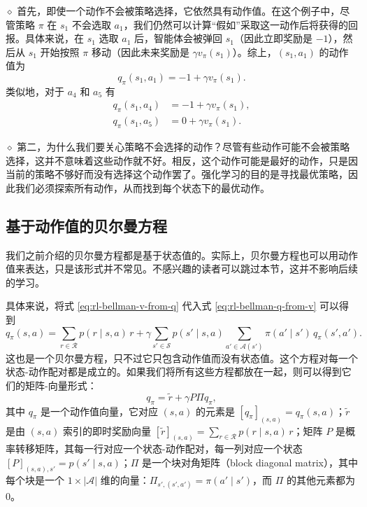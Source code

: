 \medskip
$\diamond$ 首先，即使一个动作不会被策略选择，它依然具有动作值。在这个例子中，尽管策略 $\pi$ 在 $s_1$ 不会选取 $a_1$，我们仍然可以计算“假如”采取这一动作后将获得的回报。具体来说，在 $s_1$ 选取 $a_1$ 后，智能体会被弹回 $s_1$（因此立即奖励是 $-1$），然后从 $s_1$ 开始按照 $\pi$ 移动（因此未来奖励是 $\gamma v_\pi(s_1)$）。综上，$(s_1, a_1)$ 的动作值为
\begin{equation*}
q_\pi(s_1, a_1) = -1 + \gamma v_\pi(s_1).
\end{equation*}
类似地，对于 $a_4$ 和 $a_5$ 有
\begin{equation*}
\begin{aligned}
q_\pi(s_1, a_4) &= -1 + \gamma v_\pi(s_1), \\
q_\pi(s_1, a_5) &= 0 + \gamma v_\pi(s_1).
\end{aligned}
\end{equation*}

\medskip
$\diamond$ 第二，为什么我们要关心策略不会选择的动作？尽管有些动作可能不会被策略选择，这并不意味着这些动作就不好。相反，这个动作可能是最好的动作，只是因当前的策略不够好而没有选择这个动作罢了。强化学习的目的是寻找最优策略，因此我们必须探索所有动作，从而找到每个状态下的最优动作。

\subsection{基于动作值的贝尔曼方程}
\label{sec:rl-bellman-action-value-bellman}

我们之前介绍的贝尔曼方程都是基于状态值的。实际上，贝尔曼方程也可以用动作值来表达，只是该形式并不常见。不感兴趣的读者可以跳过本节，这并不影响后续的学习。

具体来说，将式 \cref{eq:rl-bellman-v-from-q} 代入式 \cref{eq:rl-bellman-q-from-v} 可以得到
\begin{equation*}
q_\pi(s, a) = \sum_{r \in \mathcal{R}} p(r \mid s, a) \, r + \gamma \sum_{s' \in \mathcal{S}} p(s' \mid s, a) \sum_{a' \in \mathcal{A}(s')} \pi(a' \mid s') \, q_\pi(s', a').
\end{equation*}
这也是一个贝尔曼方程，只不过它只包含动作值而没有状态值。这个方程对每一个状态-动作配对都是成立的。如果我们将所有这些方程都放在一起，则可以得到它们的矩阵-向量形式：
\begin{equation}
q_\pi = \tilde{r} + \gamma P \Pi q_\pi,
\label{eq:rl-bellman-action-mv}
\end{equation}
其中 $q_\pi$ 是一个动作值向量，它对应 $(s, a)$ 的元素是 $[q_\pi]_{(s,a)} = q_\pi(s, a)$；$\tilde{r}$ 是由 $(s, a)$ 索引的即时奖励向量 $[\tilde{r}]_{(s,a)} = \sum_{r \in \mathcal{R}} p(r \mid s, a) \, r$；矩阵 $P$ 是概率转移矩阵，其每一行对应一个状态-动作配对，每一列对应一个状态 $[P]_{(s,a),s'} = p(s' \mid s, a)$；$\Pi$ 是一个块对角矩阵（block diagonal matrix），其中每个块是一个 $1 \times |\mathcal{A}|$ 维的向量：$\Pi_{s',(s',a')} = \pi(a' \mid s')$，而 $\Pi$ 的其他元素都为 $0$。

